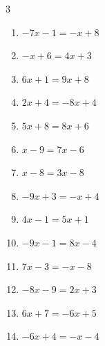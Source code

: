 \begin{multicols}{3}
\begin{enumerate}

  \item $-7x-1=-x+8$


  \item $-x+6=4x+3$


  \item $6x+1=9x+8$


  \item $2x+4=-8x+4$

        \phantom{$\displaystyle x=0$}

  \item $5x+8=8x+6$


  \item $x-9=7x-6$


  \item $x-8=3x-8$

        \phantom{$\displaystyle x=0$}

  \item $-9x+3=-x+4$


  \item $4x-1=5x+1$

        \phantom{$\displaystyle x=-2$}

  \item $-9x-1=8x-4$


  \item $7x-3=-x-8$


  \item $-8x-9=2x+3$


  \item $6x+7=-6x+5$


  \item $-6x+4=-x-4$


\end{enumerate}
\end{multicols}
